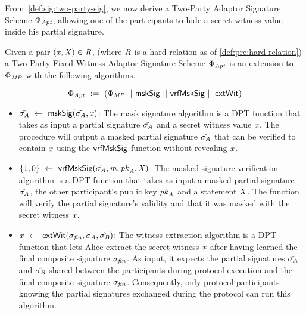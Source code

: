 From~\cref{def:sig:two-party-sig}, we now derive a Two-Party Adaptor Signature Scheme $\Phi_{\mathit{Apt}}$, allowing one of the participants to hide a secret witness value inside his partial signature.
\begin{definition}
    \label{def:sig:two-party-fixed-wit-apt-sig}
    Given a pair $(\mathit{x}, \mathit{X}) \in \mathit{R}$, (where $\mathit{R}$ is a hard relation as of \cref{def:pre:hard-relation}) a Two-Party Fixed Witness Adaptor Signature Scheme $\Phi_{\mathit{Apt}}$ is an extension to $\Phi_{\mathit{MP}}$ with the following algorithms.

    \[ \Phi_{\mathit{Apt}} ~:=~ (\Phi_{\mathit{MP}} ~||~ \mathsf{mskSig} ~||~ \mathsf{vrfMskSig} ~||~ \mathsf{extWit}) \]

    \begin{itemize}
        \item $\hat{\sigma_{\mathit{A}}} ~\leftarrow~ \mathsf{mskSig}(\tilde{\sigma_{\mathit{A}}}, \mathit{x})$: The mask signature algorithm is a DPT function that takes as input a partial signature $\tilde{\sigma_{\mathit{A}}}$ and a secret witness value $\mathit{x}$.
        The procedure will output a masked partial signature $\hat{\sigma_{\mathit{A}}}$ that can be verified to contain $\mathit{x}$ using the $\mathsf{vrfMskSig}$ function without revealing $\mathit{x}$.

        \item $\{1,0\} ~\leftarrow~ \mathsf{vrfMskSig}(\hat{\sigma_{\mathit{A}}},\mathit{m},\mathit{pk}_{\mathit{A}},\mathit{X})$: The masked signature verification algorithm is a DPT function that takes as input a masked partial signature $\hat{\sigma_{\mathit{A}}}$, the other participant's public key $\mathit{pk}_{\mathit{A}}$ and a statement $\mathit{X}$.
        The function will verify the partial signature's validity and that it was masked with the secret witness $\mathit{x}$.

        \item $\mathit{x} ~\leftarrow~ \mathsf{extWit}(\sigma_{\mathit{fin}}, \tilde{\sigma_{\mathit{A}}}, \hat{\sigma_{\mathit{B}}})$: The witness extraction algorithm is a DPT function that lets Alice extract the secret witness $\mathit{x}$ after having learned the final composite signature $\sigma_{\mathit{fin}}$.
        As input, it expects the partial signatures $\tilde{\sigma_{\mathit{A}}}$ and $\hat{\sigma_{\mathit{B}}}$ shared between the participants during protocol execution and the final composite signature $\sigma_{\mathit{fin}}$.
        Consequently, only protocol participants knowing the partial signatures exchanged during the protocol can run this algorithm.
    \end{itemize}
\end{definition}


